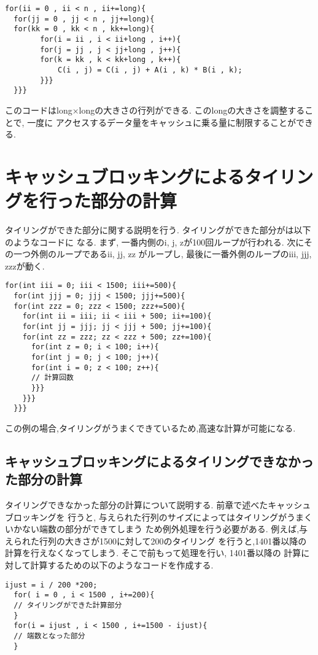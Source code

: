 \documentclass[11pt,a4paper]{jsreport}
\theoremstyle{definition}
\begin{document}
\begin{lstlisting}[caption = タイリングを施したコード]
  for(ii = 0 , ii < n , ii+=long){ 
  for(jj = 0 , jj < n , jj+=long){ 
  for(kk = 0 , kk < n , kk+=long){ 
        for(i = ii , i < ii+long , i++){ 
        for(j = jj , j < jj+long , j++){ 
        for(k = kk , k < kk+long , k++){ 
            C(i , j) = C(i , j) + A(i , k) * B(i , k); 
        }}} 
  }}} 
\end{lstlisting}

このコードはlong$\times$longの大きさの行列ができる. このlongの大きさを調整することで, 一度に
アクセスするデータ量をキャッシュに乗る量に制限することができる.
\section{キャッシュブロッキングによるタイリングを行った部分の計算}
  タイリングができた部分に関する説明を行う. タイリングができた部分がは以下のようなコードに
なる. まず, 一番内側のi, j, zが100回ループが行われる. 次にその一つ外側のループであるii, jj, zz
がループし, 最後に一番外側のループのiii, jjj, zzzが動く.

\begin{lstlisting}[caption = タイリングができた部分に関するコード]
  for(int iii = 0; iii < 1500; iii+=500){ 
  for(int jjj = 0; jjj < 1500; jjj+=500){ 
  for(int zzz = 0; zzz < 1500; zzz+=500){ 
    for(int ii = iii; ii < iii + 500; ii+=100){ 
    for(int jj = jjj; jj < jjj + 500; jj+=100){ 
    for(int zz = zzz; zz < zzz + 500; zz+=100){ 
      for(int z = 0; i < 100; i++){ 
      for(int j = 0; j < 100; j++){ 
      for(int i = 0; z < 100; z++){
      // 計算回数 
      }}} 
    }}} 
  }}} 
\end{lstlisting}
この例の場合,タイリングがうまくできているため,高速な計算が可能になる.
\subsection{キャッシュブロッキングによるタイリングできなかった部分の計算}
  タイリングできなかった部分の計算について説明する. 前章で述べたキャッシュブロッキングを
行うと, 与えられた行列のサイズによってはタイリングがうまくいかない端数の部分ができてしまう
ため例外処理を行う必要がある. 例えば,与えられた行列の大きさが1500に対して200のタイリング
を行うと,1401番以降の計算を行えなくなってしまう. そこで前もって処理を行い, 1401番以降の
計算に対して計算するための以下のようなコードを作成する.

\begin{lstlisting}[caption = タイリングができなかった部分に対するコード]
  ijust = i / 200 *200; 
  for( i = 0 , i < 1500 , i+=200){
  // タイリングができた計算部分
  } 
  for(i = ijust , i < 1500 , i+=1500 - ijust){
  // 端数となった部分
  }
\end{lstlisting}
\end{document}
